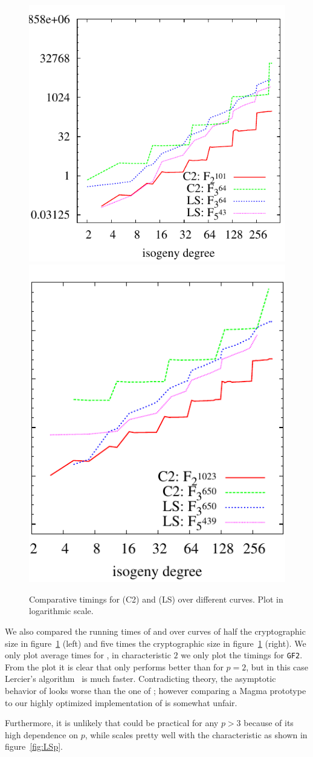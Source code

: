 \begin{figure}
  \centering
  \includegraphics[height=0.45\textwidth]{isogeny/C2-LS}
  \includegraphics[height=0.45\textwidth]{isogeny/C2-LS2}
  \caption{Comparative timings for \ctwoasfimc{} (C2) and
     (LS) over different curves. Plot in
    logarithmic scale.}
  \label{fig:comp}
\end{figure}

We also compared the running times of \ctwoasfimc{} and
 over curves of half the cryptographic size in
figure~\ref{fig:comp} (left) and five times the cryptographic size in
figure~\ref{fig:comp} (right). We only plot average times for \ctwo{},
in characteristic $2$ we only plot the timings for \texttt{GF2}. From
the plot it is clear that \ctwoasfimc{} only performs better than
 for $p=2$, but in this case Lercier's
algorithm~\cite{lercier96} is much faster.  Contradicting theory, the
asymptotic behavior of  looks worse than the one
of \ctwoasfimc{}; however comparing a Magma prototype to our highly
optimized implementation of \ctwoasfimc{} is somewhat unfair.

Furthermore, it is unlikely that \ctwoasfimc{} could be practical for
any $p>3$ because of its high dependence on $p$, while
 scales pretty well with the characteristic as
shown in figure~\ref{fig:LSp}.

